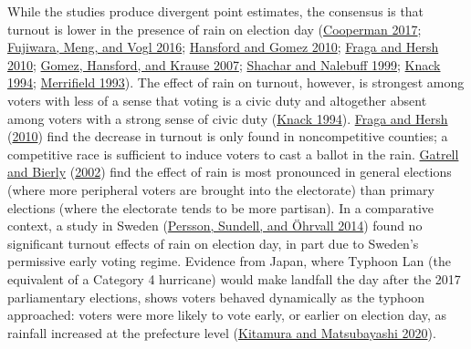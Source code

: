 \documentclass[
  12pt,
]{article}
\begin{document}
While the studies produce divergent point estimates, the consensus is that turnout is lower in the presence of rain on election day (\protect\hyperlink{ref-Cooperman2017}{Cooperman 2017}; \protect\hyperlink{ref-Fujiwara2016}{Fujiwara, Meng, and Vogl 2016}; \protect\hyperlink{ref-Hansford2010}{Hansford and Gomez 2010}; \protect\hyperlink{ref-Fraga2010}{Fraga and Hersh 2010}; \protect\hyperlink{ref-Gomez2007}{Gomez, Hansford, and Krause 2007}; \protect\hyperlink{ref-Shachar1999}{Shachar and Nalebuff 1999}; \protect\hyperlink{ref-Knack1994}{Knack 1994}; \protect\hyperlink{ref-Merrifield1993}{Merrifield 1993}). The effect of rain on turnout, however, is strongest among voters with less of a sense that voting is a civic duty and altogether absent among voters with a strong sense of civic duty (\protect\hyperlink{ref-Knack1994}{Knack 1994}). \protect\hyperlink{ref-Fraga2010}{Fraga and Hersh} (\protect\hyperlink{ref-Fraga2010}{2010}) find the decrease in turnout is only found in noncompetitive counties; a competitive race is sufficient to induce voters to cast a ballot in the rain. \protect\hyperlink{ref-Gatrell2002}{Gatrell and Bierly} (\protect\hyperlink{ref-Gatrell2002}{2002}) find the effect of rain is most pronounced in general elections (where more peripheral voters are brought into the electorate) than primary elections (where the electorate tends to be more partisan). In a comparative context, a study in Sweden (\protect\hyperlink{ref-Persson2014}{Persson, Sundell, and Öhrvall 2014}) found no significant turnout effects of rain on election day, in part due to Sweden's permissive early voting regime. Evidence from Japan, where Typhoon Lan (the equivalent of a Category 4 hurricane) would make landfall the day after the 2017 parliamentary elections, shows voters behaved dynamically as the typhoon approached: voters were more likely to vote early, or earlier on election day, as rainfall increased at the prefecture level (\protect\hyperlink{ref-Kitamura2020}{Kitamura and Matsubayashi 2020}).
\end{document}
